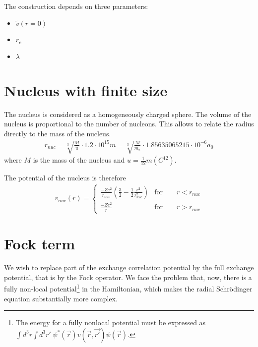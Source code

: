 \documentclass[11pt,a4paper]{report}
\begin{document}
The construction depends on three parameters:
\begin{itemize}
\item $\tilde{v}(r=0)$
\item $r_c$
\item $\lambda$
\end{itemize}

\section{Nucleus with finite size}
The nucleus is considered as a homogeneously charged sphere. The
volume of the nucleus is proportional to the number of nucleons.  This
allows to relate the radius directly to the mass of the
nucleus.\cite{cooper53_pr92_801,hofstadter56_rmp28_214}
\begin{eqnarray*}
r_{nuc}=\sqrt[3]{\frac{M}{u}}\cdot1.2\cdot 10^{15} m 
=\sqrt[3]{\frac{M}{m_e}}\cdot1.85635065215\cdot 10^{-6}  a_0
\end{eqnarray*}
where $M$ is the mass of the nucleus and
$u=\frac{1}{12}m(C^{12})$. 

The potential of the nucleus is therefore
\begin{eqnarray*}
v_{nuc}(r)=
\left\lbrace
\begin{array}{cc}
\frac{-Ze^2}{r_{nuc}}\left(\frac{3}{2}-\frac{1}{2}\frac{r^2}{r_{nuc}^2}\right)
&\textrm{for}\qquad r<r_{nuc}\\
\frac{-Ze^2}{r}
&\textrm{for}\qquad r>r_{nuc}
\end{array}\right.
\end{eqnarray*}

\section{Fock term}
We wish to replace part of the exchange correlation potential by the
full exchange potential, that is by the Fock operator. We face the
problem that, now, there is a fully non-local potential\footnote{The
  energy for a fully nonlocal potential must be expressed as $\int
  d^3r\int d^3r'\;
  \psi^*(\vec{r})v(\vec{r},\vec{r'})\psi(\vec{r})$.} in the
  Hamiltonian, which makes the radial Schr\"odinger equation
  substantially more complex.
\end{document}
